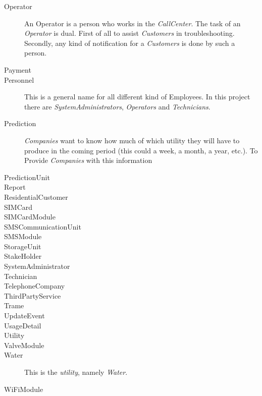 \begin{description}
\item[Operator] An Operator is a person who works in the \emph{CallCenter}. The
task of an \emph{Operator} is dual. First of all to assist \emph{Customers} in
troubleshooting. Secondly, any kind of notification for a \emph{Customers} is
done by such a person.

\item[Payment]

\item[Personnel] This is a general name for all different kind of Employees. In
this project there are \emph{SystemAdministrators}, \emph{Operators} and
\emph{Technicians}.

\item[Prediction] \emph{Companies} want to know how much of which utility they
will have to produce in the coming period (this could a week, a month, a year,
etc.). To Provide \emph{Companies} with this information 

\item[PredictionUnit]

\item[Report]

\item[ResidentialCustomer]

\item[SIMCard]

\item[SIMCardModule]

\item[SMSCommunicationUnit]

\item[SMSModule]

\item[StorageUnit]

\item[StakeHolder]

\item[SystemAdministrator]

\item[Technician]

\item[TelephoneCompany]

\item[ThirdPartyService]

\item[Trame]

\item[UpdateEvent]

\item[UsageDetail]

\item[Utility]

\item[ValveModule]

\item[Water] This is the \emph{utility}, namely \emph{Water}.

\item[WiFiModule]

\end{description}
